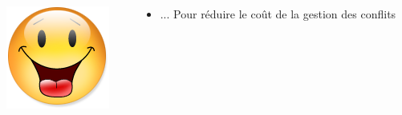 \documentclass[xcolor={x11names,svgnames},x11names,svgnames]{beamer}
\begin{document}
\begin{frame}[label=idea1]
  \begin{columns}[c]
    \begin{column}{.1\textwidth}
      \vspace{3mm}
      \includegraphics[width=\textwidth]{Content.png}
    \end{column}
    
    \begin{column}{.9\textwidth}
      \begin{itemize}
      \item ... Pour réduire le coût de la gestion des conflits
      \end{itemize}
    \end{column}
  \end{columns}  
\end{frame}

\end{document}
